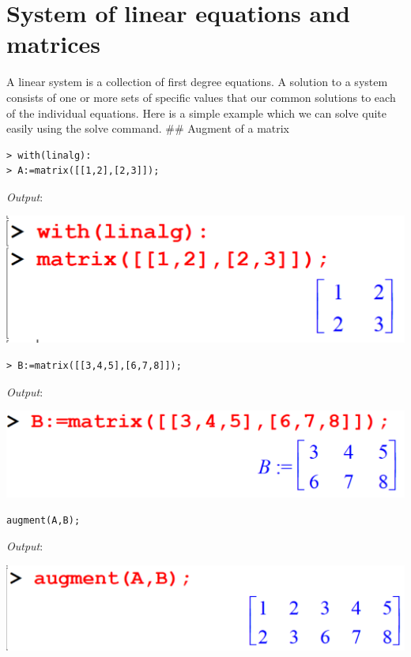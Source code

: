 \documentclass[
]{book}
\theoremstyle{definition}
\theoremstyle{definition}
\theoremstyle{definition}
\theoremstyle{definition}
\theoremstyle{remark}
\begin{document}
\chapter{System of linear equations and matrices}\label{system-of-linear-equations-and-matrices}

A linear system is a collection of first degree equations. A solution to a system consists of one or more sets of specific values that our common solutions to each of the individual equations. Here is a simple example which we can solve quite easily using the solve command.
\#\# Augment of a matrix

\begin{verbatim}
> with(linalg):
> A:=matrix([[1,2],[2,3]]);
\end{verbatim}

\emph{Output}:

\includegraphics{figures/Lessson 5/fig1.png}

\begin{verbatim}
> B:=matrix([[3,4,5],[6,7,8]]);
\end{verbatim}

\emph{Output}:

\includegraphics{figures/Lessson 5/fig2.png}

\begin{verbatim}
augment(A,B);
\end{verbatim}

\emph{Output}:

\includegraphics{figures/Lessson 5/fig3.png}
\end{document}
